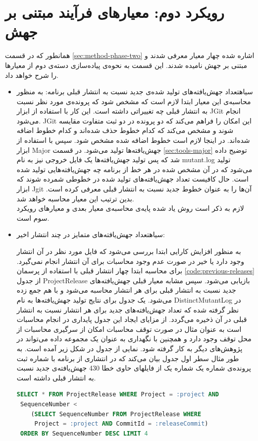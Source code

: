 \section{رویکرد دوم: معیارهای فرآیند مبتنی بر جهش}
همانطور که در قسمت \ref{sec:method-phase-two} اشاره شده چهار معیار معرفی شدند و مبتنی بر جهش نامیده شدند. این قسمت به نحوه‌ی پیاده‌سازی دسته‌ی دوم از معیارها را شرح خواهد داد. 
\begin{itemize}
\item
{}‌سیاه{تعداد جهش‌یافته‌های تولید شده‌ی جدید نسبت به انتشار قبلی برنامه:}
به منظور محاسبه‌ی این معیار ابتدا لازم است که مشخص شود که پرونده‌ی مورد نظر نسبت به انتشار قبلی چه تغییراتی داشته است. این کار با استفاده از ابزار JGit انجام  می‌شود. JGit این امکان را فراهم می‌کند که دو پرونده در دو ثبت متفاوت مقایسه شوند و مشخص می‌کند که کدام خطوط حذف شده‌اند و کدام خطوط اضافه شده‌اند. در اینجا لازم است خطوط اضافه شده  مشخص شود. سپس با استفاده از ابزار Major جهش‌یافته‌ها تولید می‌شود. در  قسمت  \ref{sec:tools-major} توضیح داده شد که پس تولید جهش‌یافته‌ها یک فایل خروجی نیز به نام mutant.log تولید می‌شود که در آن مشخص شده در هر خط از برنامه چه جهش‌یافته‌هایی تولید شده است. حال کافیست تعداد جهش‌یافته‌های تولید شده در خطوطی شمرده شوند که ابزار Jgit آن‌ها را به عنوان خطوط جدید نسبت به انتشار قبلی معرفی کرده است. بدین ترتیب این معیار محاسبه خواهد شد.\\
لازم به ذکر است روش یاد شده پایه‌ی محاسبه‌ی معیار بعدی و معیارهای رویکرد سوم است.
\item
{}‌سیاه{تعداد جهش‌یافته‌های متمایز در چند انتشار اخیر:}

 به منظور افزایش کارایی ابتدا بررسی می‌شود که فایل مورد نظر در آن انتشار وجود دارد یا خیر در صورت عدم وجود محاسبات برای آن انتشار انجام نمی‌گیرد.
برای محاسبه ابتدا چهار انتشار قبلی  با استفاده از پرسمان  \ref{code:previous-releases} از جدول ProjectRelease بازیابی می‌شود. سپس مشابه معیار قبلی جهش‌یافته‌های جدید نسبت به انتشار قبلی برای هر انتشار محاسبه می‌شود و با هم جمع زده می‌شود.  یک جدول برای نتایج تولید جهش‌یافته‌ها  به نام  DistinctMutantLog در نظر گرفته شده که تعداد جهش‌یافته‌های جدید برای هر انتشار نسبت به انتشار قبلی در آن ذخیره می‌گردد. از مزایای ایجاد این جدول پایداری در انجام محاسبات است به عنوان مثال  در صورت توقف محاسبات امکان از سرگیری محاسبات از محل توقف وجود  دارد و همچنین  با نگهداری به عنوان یک مجموعه داده می‌تواند در پژوهش‌های دیگر به کار گرفته شود. نمایی از جدول در شکل زیر آمده است. به طور مثال سطر اول جدول بیان می‌کند که در انتشاری از برنامه با شماره ثبت    پرونده‌ی شماره یک شماره یک از فایلهای حاوی خطا 430 جهش‌یافته‌ی جدید نسبت به انتشار قبلی داشته است.
\begin{latin}
	\begin{lstlisting}[language=SQL]
SELECT * FROM ProjectRelease WHERE Project = :project AND
 SequenceNumber <  
	(SELECT SequenceNumber FROM ProjectRelease WHERE 
	 Project = :project AND CommitId = :releaseCommit) 
 ORDER BY SequenceNumber DESC LIMIT 4 
\end{lstlisting}
\end{latin}
\label{code:previous-releases}


\end{itemize}
